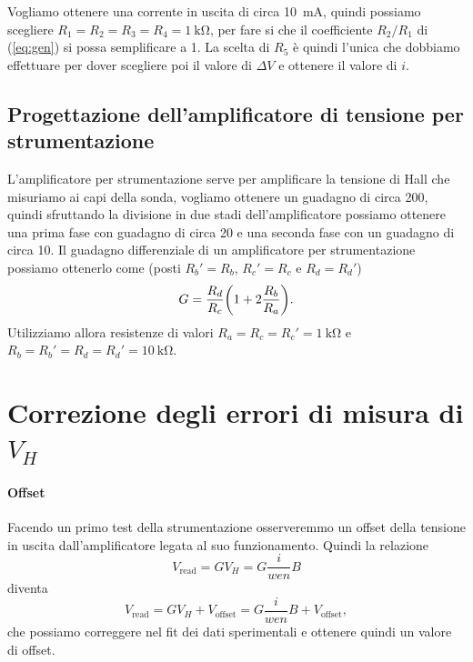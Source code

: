 \documentclass[fleqn,varvw,preprintnumbers,citeautoscript]{memo}
\begin{document}
Vogliamo ottenere una corrente in uscita di circa \SI{10}{\milli\ampere}, quindi possiamo scegliere $R_1=R_2=R_3=R_4=\SI{1}{\kilo\ohm}$, per fare si che il coefficiente $R_2/R_1$ di (\ref{eq:gen}) si possa semplificare a 1. La scelta di $R_5$ è quindi l'unica che dobbiamo effettuare per dover scegliere poi il valore di $\Delta V$ e ottenere il valore di $i$.

\subsection{Progettazione dell'amplificatore di tensione per strumentazione}

L'amplificatore per strumentazione serve per amplificare la tensione di Hall che misuriamo ai capi della sonda, vogliamo ottenere un guadagno di circa 200, quindi sfruttando la divisione in due stadi dell'amplificatore possiamo ottenere una prima fase con guadagno di circa 20 e una seconda fase con un guadagno di circa 10. Il guadagno differenziale di un amplificatore per strumentazione possiamo ottenerlo come (posti $R_b'=R_b$, $R_c'=R_c$ e $R_d=R_d'$)\begin{equation}
    G= \frac{R_d}{R_c}\qty(1+2\frac{R_b}{R_a}).\label{eq:gain_diff}
\end{equation} Utilizziamo allora resistenze di valori $R_a=R_c=R_c'=\SI{1}{\kilo\ohm}$ e $R_b=R_b'=R_d=R_d'=\SI{10}{\kilo\ohm}$.

\section{Correzione degli errori di misura di $V_H$}

\paragraph{Offset} Facendo un primo test della strumentazione osserveremmo un offset della tensione in uscita dall'amplificatore legata al suo funzionamento. Quindi la relazione \begin{equation}
    V_\text{read} = GV_H = G\frac{i}{wen}B
\end{equation} diventa \begin{equation}
    V_\text{read} = GV_H + V_\text{offset} = G\frac{i}{wen}B + V_\text{offset}\label{eq:offset},
\end{equation} che possiamo correggere nel fit dei dati sperimentali e ottenere quindi un valore di offset. 
\end{document}
